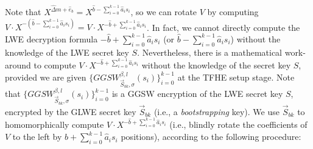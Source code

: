 Note that $X^{\hat{\Delta} m + \hat{e}_b} = X^{\hat{b} - \sum_{i=0}^{k-1}{\hat{a}_is_i}}$, so we can rotate $V$ by computing $V \cdot X^{-(\hat{b} - \sum_{i=0}^{k-1}{\hat{a}_is_i})} = V \cdot X^{-\hat{b} + \sum_{i=0}^{k-1}{\hat{a}_is_i}}$. In fact, we cannot directly compute the LWE decryption formula $-\hat{b} + \sum_{i=0}^{k-1}{\hat{a}_is_i}$ (or $\hat{b} - \sum_{i=0}^{k-1}{\hat{a}_is_i}$) without the knowledge of the LWE secret key $S$. Nevertheless, there is a mathematical work-around to compute $V \cdot X^{-\hat{b} + \sum_{i=0}^{k-1}{\hat{a}_is_i}}$ without the knowledge of the secret key $S$, provided we are given $\{GGSW_{\vec{S}_{bk}, \sigma}^{\beta, l}(s_i)\}_{i=0}^{k-1}$ at the TFHE setup stage. Note that $\{GGSW_{\vec{S}_{bk}, \sigma}^{\beta, l}(s_i)\}_{i=0}^{k-1}$ is a GGSW encryption of the LWE secret key $S$, encrypted by the GLWE secret key $\vec{S}_{bk}$ (i.e., a \textit{bootstrapping} key). We use $\vec{S}_{bk}$ to homomorphically compute $V \cdot X^{-\hat{b} + \sum_{i=0}^{k-1}{\hat{a}_is_i}}$ (i.e., blindly rotate the coefficients of $V$ to the left by $\hat{b} + \sum_{i=0}^{k-1}{\hat{a}_is_i}$ positions), according to the following procedure:

